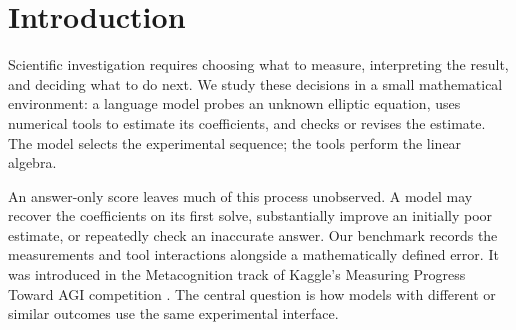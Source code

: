 \documentclass{article}
\begin{document}
\raggedbottom
{}
\printAffiliationsAndNotice{}

\begin{abstract}
We study how language models choose and use measurements when identifying an
unknown differential equation. In this benchmark, a model selects weak-form test
functions under a query budget and uses numerical tools to fit and check the
hidden coefficients. The interaction records measurement choices, verification,
error reduction, and confidence alongside final accuracy. We analyze 180 scored
runs from six models on 30 shared tasks. On medium tasks, Gemini 3.1 Pro and
Claude Opus 4.6 both achieve 9/10 success, but their mean consistency-check
counts are 2.3 and 7.6. Equal aggregate success thus coexists with different
patterns of tool use. Numerical controls provide a reference: a fixed sine
design solves all 30 reconstructed tasks and succeeds on 92\%, 91\%, and 98\%
of 100 fresh tasks in each of three settings at the minimum query budget.
The resulting records support a study of experimental behavior, while the
benefit of adaptive measurement selection remains an open question. We release
the environment, analysis, and numerical controls.
\end{abstract}

\section{Introduction}

Scientific investigation requires choosing what to measure, interpreting the
result, and deciding what to do next. We study these decisions in a small
mathematical environment: a language model probes an unknown elliptic equation,
uses numerical tools to estimate its coefficients, and checks or revises the
estimate. The model selects the experimental sequence; the tools perform the
linear algebra.

An answer-only score leaves much of this process unobserved. A model may recover
the coefficients on its first solve, substantially improve an initially poor
estimate, or repeatedly check an inaccurate answer. Our benchmark records the
measurements and tool interactions alongside a mathematically defined error.
It was introduced in the Metacognition track of Kaggle's Measuring Progress
Toward AGI competition \citep{kaggle2026pde,burnell2026cognitive}. The central
question is how models with different or similar outcomes use the same
experimental interface.
\end{document}
